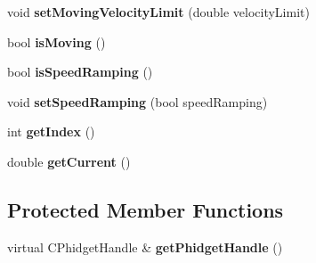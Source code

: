\begin{DoxyCompactItemize}
\item 
\hypertarget{classdrobot_1_1device_1_1actuator_1_1PhidgetAdvancedServo_a2d075c4f19b30e8ac705f56b4dd55603}{void {\bfseries set\-Moving\-Velocity\-Limit} (double velocity\-Limit)}\label{classdrobot_1_1device_1_1actuator_1_1PhidgetAdvancedServo_a2d075c4f19b30e8ac705f56b4dd55603}

\item 
\hypertarget{classdrobot_1_1device_1_1actuator_1_1PhidgetAdvancedServo_a4a12cf37d6421b7e109e2c6df0efde01}{bool {\bfseries is\-Moving} ()}\label{classdrobot_1_1device_1_1actuator_1_1PhidgetAdvancedServo_a4a12cf37d6421b7e109e2c6df0efde01}

\item 
\hypertarget{classdrobot_1_1device_1_1actuator_1_1PhidgetAdvancedServo_aa2dc25484399961d9b02a4cbad9b31f6}{bool {\bfseries is\-Speed\-Ramping} ()}\label{classdrobot_1_1device_1_1actuator_1_1PhidgetAdvancedServo_aa2dc25484399961d9b02a4cbad9b31f6}

\item 
\hypertarget{classdrobot_1_1device_1_1actuator_1_1PhidgetAdvancedServo_aaf173f589ee7dee578ef960919debee3}{void {\bfseries set\-Speed\-Ramping} (bool speed\-Ramping)}\label{classdrobot_1_1device_1_1actuator_1_1PhidgetAdvancedServo_aaf173f589ee7dee578ef960919debee3}

\item 
\hypertarget{classdrobot_1_1device_1_1actuator_1_1PhidgetAdvancedServo_abab8f3244b803c8cc0c58690f21b22ed}{int {\bfseries get\-Index} ()}\label{classdrobot_1_1device_1_1actuator_1_1PhidgetAdvancedServo_abab8f3244b803c8cc0c58690f21b22ed}

\item 
\hypertarget{classdrobot_1_1device_1_1actuator_1_1PhidgetAdvancedServo_a7594207481582d74e3921f9520b47d74}{double {\bfseries get\-Current} ()}\label{classdrobot_1_1device_1_1actuator_1_1PhidgetAdvancedServo_a7594207481582d74e3921f9520b47d74}

\end{DoxyCompactItemize}
\subsection*{Protected Member Functions}
\begin{DoxyCompactItemize}
\item 
\hypertarget{classdrobot_1_1device_1_1actuator_1_1PhidgetAdvancedServo_acdbdef2906b308868745f1d5d12559a2}{virtual C\-Phidget\-Handle \& {\bfseries get\-Phidget\-Handle} ()}\label{classdrobot_1_1device_1_1actuator_1_1PhidgetAdvancedServo_acdbdef2906b308868745f1d5d12559a2}

\end{DoxyCompactItemize}
